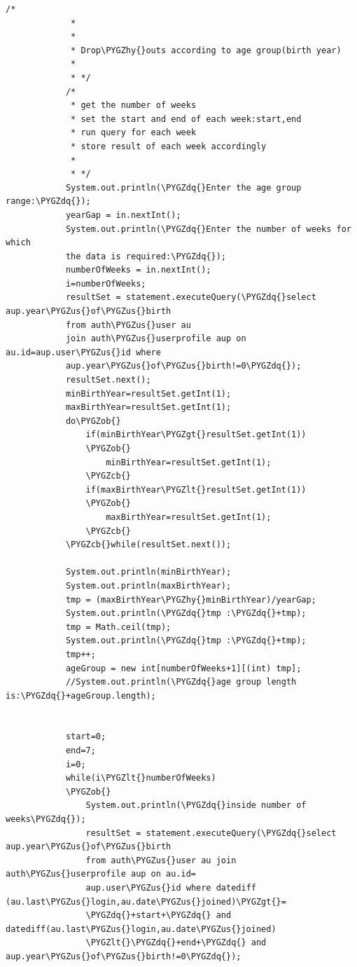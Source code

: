 \documentclass[a4paper,12pt,oneside]{sphinxmanual}
\def\PYGZus{\char`\_}
\def\PYGZob{\char`\{}
\def\PYGZcb{\char`\}}
\def\PYGZlt{\char`\<}
\def\PYGZgt{\char`\>}
\def\PYGZhy{\char`\-}
\def\PYGZdq{\char`\"}
\begin{document}
\begin{Verbatim}[commandchars=\\\{\}]
            /*
             *
             *
             * Drop\PYGZhy{}outs according to age group(birth year)
             *
             * */
            /*
             * get the number of weeks
             * set the start and end of each week:start,end
             * run query for each week
             * store result of each week accordingly
             *
             * */
            System.out.println(\PYGZdq{}Enter the age group range:\PYGZdq{});
            yearGap = in.nextInt();
            System.out.println(\PYGZdq{}Enter the number of weeks for which
            the data is required:\PYGZdq{});
            numberOfWeeks = in.nextInt();
            i=numberOfWeeks;
            resultSet = statement.executeQuery(\PYGZdq{}select aup.year\PYGZus{}of\PYGZus{}birth
            from auth\PYGZus{}user au
            join auth\PYGZus{}userprofile aup on au.id=aup.user\PYGZus{}id where
            aup.year\PYGZus{}of\PYGZus{}birth!=0\PYGZdq{});
            resultSet.next();
            minBirthYear=resultSet.getInt(1);
            maxBirthYear=resultSet.getInt(1);
            do\PYGZob{}
                if(minBirthYear\PYGZgt{}resultSet.getInt(1))
                \PYGZob{}
                    minBirthYear=resultSet.getInt(1);
                \PYGZcb{}
                if(maxBirthYear\PYGZlt{}resultSet.getInt(1))
                \PYGZob{}
                    maxBirthYear=resultSet.getInt(1);
                \PYGZcb{}
            \PYGZcb{}while(resultSet.next());

            System.out.println(minBirthYear);
            System.out.println(maxBirthYear);
            tmp = (maxBirthYear\PYGZhy{}minBirthYear)/yearGap;
            System.out.println(\PYGZdq{}tmp :\PYGZdq{}+tmp);
            tmp = Math.ceil(tmp);
            System.out.println(\PYGZdq{}tmp :\PYGZdq{}+tmp);
            tmp++;
            ageGroup = new int[numberOfWeeks+1][(int) tmp];
            //System.out.println(\PYGZdq{}age group length is:\PYGZdq{}+ageGroup.length);


            start=0;
            end=7;
            i=0;
            while(i\PYGZlt{}numberOfWeeks)
            \PYGZob{}
                System.out.println(\PYGZdq{}inside number of weeks\PYGZdq{});
                resultSet = statement.executeQuery(\PYGZdq{}select aup.year\PYGZus{}of\PYGZus{}birth
                from auth\PYGZus{}user au join auth\PYGZus{}userprofile aup on au.id=
                aup.user\PYGZus{}id where datediff (au.last\PYGZus{}login,au.date\PYGZus{}joined)\PYGZgt{}=
                \PYGZdq{}+start+\PYGZdq{} and datediff(au.last\PYGZus{}login,au.date\PYGZus{}joined)
                \PYGZlt{}\PYGZdq{}+end+\PYGZdq{} and aup.year\PYGZus{}of\PYGZus{}birth!=0\PYGZdq{});


\end{Verbatim}
\end{document}
